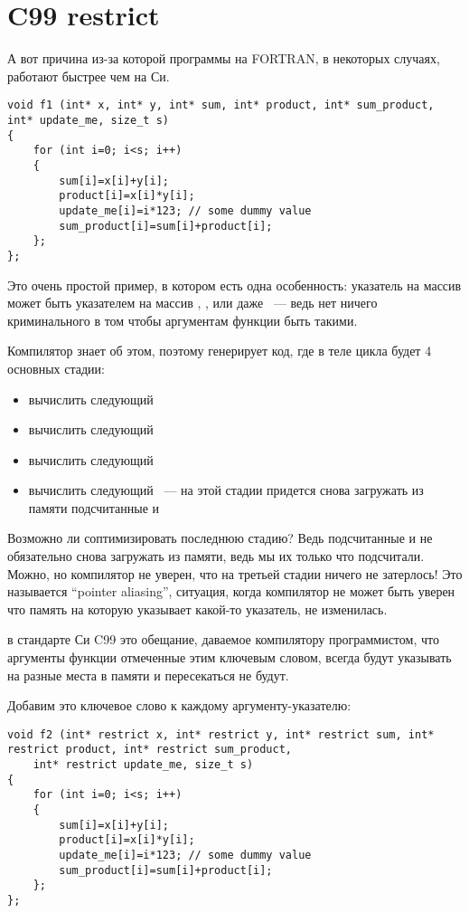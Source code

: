 \section{C99 restrict}

А вот причина из-за которой программы на FORTRAN, в некоторых случаях, работают быстрее чем на Си.

\begin{lstlisting}
void f1 (int* x, int* y, int* sum, int* product, int* sum_product, int* update_me, size_t s)
{
	for (int i=0; i<s; i++)
	{
		sum[i]=x[i]+y[i];
		product[i]=x[i]*y[i];
		update_me[i]=i*123; // some dummy value
		sum_product[i]=sum[i]+product[i];	
	};
};
\end{lstlisting}

Это очень простой пример, в котором есть одна особенность: указатель на массив  может быть указателем 
на массив
, , или даже  ~--- 
ведь нет ничего криминального в том чтобы аргументам функции быть такими.

Компилятор знает об этом, поэтому генерирует код, где в теле цикла будет 4 основных стадии:
\begin{itemize}
\item вычислить следующий 
\item вычислить следующий 
\item вычислить следующий 
\item вычислить следующий  ~--- на этой стадии придется снова загружать из 
      памяти подсчитанные  и 
\end{itemize}

Возможно ли соптимизировать последнюю стадию? Ведь подсчитанные  и  не обязательно 
снова загружать из памяти,
ведь мы их только что подсчитали. Можно, но компилятор не уверен, что на третьей стадии ничего не затерлось! Это называется
``pointer aliasing'', ситуация, когда компилятор не может быть уверен что память на которую указывает какой-то указатель, 
не изменилась.

 в стандарте Си C99\cite{C99TC3} это обещание, даваемое компилятору программистом, 
что аргументы функции отмеченные этим 
ключевым словом,
всегда будут указывать на разные места в памяти и пересекаться не будут.

Добавим это ключевое слово к каждому аргументу-указателю:

\begin{lstlisting}
void f2 (int* restrict x, int* restrict y, int* restrict sum, int* restrict product, int* restrict sum_product, 
	int* restrict update_me, size_t s)
{
	for (int i=0; i<s; i++)
	{
		sum[i]=x[i]+y[i];
		product[i]=x[i]*y[i];
		update_me[i]=i*123; // some dummy value
		sum_product[i]=sum[i]+product[i];	
	};
};
\end{lstlisting}

